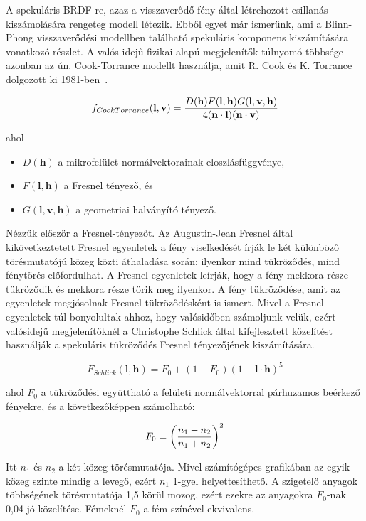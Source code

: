 A spekuláris BRDF-re, azaz a visszaverődő fény által létrehozott csillanás kiszámolására rengeteg modell létezik. Ebből egyet már ismerünk, ami a Blinn-Phong visszaverődési modellben található spekuláris komponens kiszámítására vonatkozó részlet. A valós idejű fizikai alapú megjelenítők túlnyomó többsége azonban az ún. Cook-Torrance modellt használja, amit R. Cook és K. Torrance dolgozott ki 1981-ben~\cite{cook1981reflectance}.

\[
f_{CookTorrance}(\mathbf{l}, \mathbf{v}) = { {D(\mathbf{h}) F(\mathbf{l}, \mathbf{h}) G(\mathbf{l}, \mathbf{v}, \mathbf{h})} \over {4(\mathbf{n} \cdot \mathbf{l})(\mathbf{n} \cdot \mathbf{v})} }
\]

ahol

\begin{itemize}[noitemsep]
\item \(D(\mathbf{h})\) a mikrofelület normálvektorainak eloszlásfüggvénye,
\item \(F(\mathbf{l}, \mathbf{h})\) a Fresnel tényező, és
\item \(G(\mathbf{l}, \mathbf{v}, \mathbf{h})\) a geometriai halványító tényező.
\end{itemize}

Nézzük először a Fresnel-tényezőt. Az Augustin-Jean Fresnel által kikövetkeztetett Fresnel egyenletek a fény viselkedését írják le két különböző törésmutatójú közeg közti áthaladása során: ilyenkor mind tükröződés, mind fénytörés előfordulhat. A Fresnel egyenletek leírják, hogy a fény mekkora része tükröződik és mekkora része törik meg ilyenkor. A fény tükröződése, amit az egyenletek megjósolnak Fresnel tükröződésként is ismert. Mivel a Fresnel egyenletek túl bonyolultak ahhoz, hogy valósidőben számoljunk velük, ezért valósidejű megjelenítőknél a Christophe Schlick által kifejlesztett közelítést használják a spekuláris tükröződés Fresnel tényezőjének kiszámítására.~\cite{schlick1994inexpensive}

\[
F_{Schlick}(\mathbf{l}, \mathbf{h}) = F_0 + (1 - F_0)(1 - \mathbf{l} \cdot \mathbf{h})^5
\]

ahol \(F_0\) a tükröződési együttható a felületi normálvektorral párhuzamos beérkező fényekre, és a következőképpen számolható:

\[
F_0 = \left( {n_1 - n_2} \over {n_1 + n_2} \right)^2
\]

Itt \(n_1\) és \(n_2\) a két közeg törésmutatója. Mivel számítógépes grafikában az egyik közeg szinte mindig a levegő, ezért \(n_1\) 1-gyel helyettesíthető. A szigetelő anyagok többségének törésmutatója 1,5 körül mozog, ezért ezekre az anyagokra \(F_0\)-nak 0,04 jó közelítése. Fémeknél \(F_0\) a fém színével ekvivalens.

